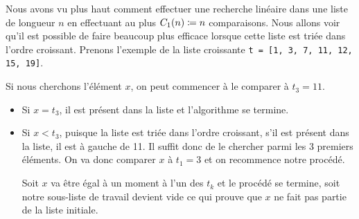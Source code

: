 \documentclass{magnoliaold}
\begin{document}
Nous avons vu plus haut comment effectuer une recherche linéaire dans une liste de longueur $n$ en
effectuant au plus $C_1(n)\coloneqq n$ comparaisons. Nous allons voir qu'il est possible de faire beaucoup plus efficace
lorsque cette liste est triée dans l'ordre croissant. Prenons l'exemple de la liste croissante
\verb!t = [1, 3, 7, 11, 12, 15, 19]!.
\begin{center}
\end{center}
Si nous cherchons l'élément $x$, on peut commencer à le comparer à $t_3=11$.
\begin{itemize}
\item Si $x=t_3$, il est présent dans la liste et l'algorithme se termine.
\item Si $x<t_3$, puisque la liste est triée dans l'ordre croissant, s'il est présent dans
  la liste, il est à gauche de 11. Il suffit donc de le chercher parmi les 3 premiers éléments.
  On va donc comparer $x$ à $t_1=3$ et on recommence notre procédé.
  \begin{center}
    \end{center}
  Soit $x$ va être égal à un moment à l'un des $t_k$ et le procédé se termine, soit notre sous-liste
  de travail devient vide ce qui prouve que $x$ ne fait pas partie de la liste initiale.
\end{itemize}
\end{document}
